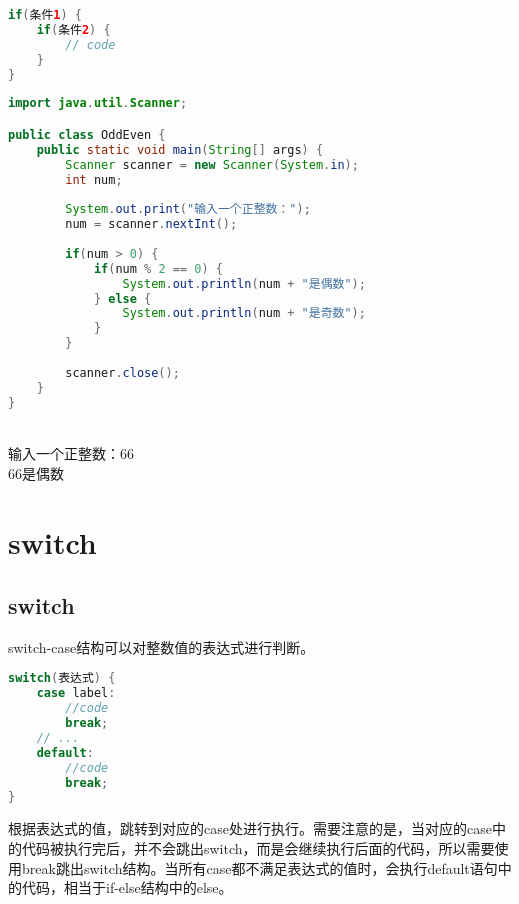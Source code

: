 \vspace{-0.5cm}

\begin{lstlisting}[language=Java]
if(条件1) {
	if(条件2) {
		// code
	}
}
\end{lstlisting}

\vspace{0.5cm}


\begin{lstlisting}[language=Java]
import java.util.Scanner;

public class OddEven {
	public static void main(String[] args) {
		Scanner scanner = new Scanner(System.in);
		int num;
		
		System.out.print("输入一个正整数：");
		num = scanner.nextInt();
		
		if(num > 0) {
			if(num % 2 == 0) {
				System.out.println(num + "是偶数");
			} else {
				System.out.println(num + "是奇数");
			}
		}
		
		scanner.close();
	}
}
\end{lstlisting}

\begin{tcolorbox}
	 \\
	输入一个正整数：66 \\
	66是偶数
\end{tcolorbox}

\newpage

\section{switch}

\subsection{switch}

switch-case结构可以对整数值的表达式进行判断。

\vspace{-0.5cm}

\begin{lstlisting}[language=Java]
switch(表达式) {
    case label:
        //code
        break;
    // ...
    default:
        //code
        break;
}
\end{lstlisting}

根据表达式的值，跳转到对应的case处进行执行。需要注意的是，当对应的case中的代码被执行完后，并不会跳出switch，而是会继续执行后面的代码，所以需要使用break跳出switch结构。当所有case都不满足表达式的值时，会执行default语句中的代码，相当于if-else结构中的else。 \\

